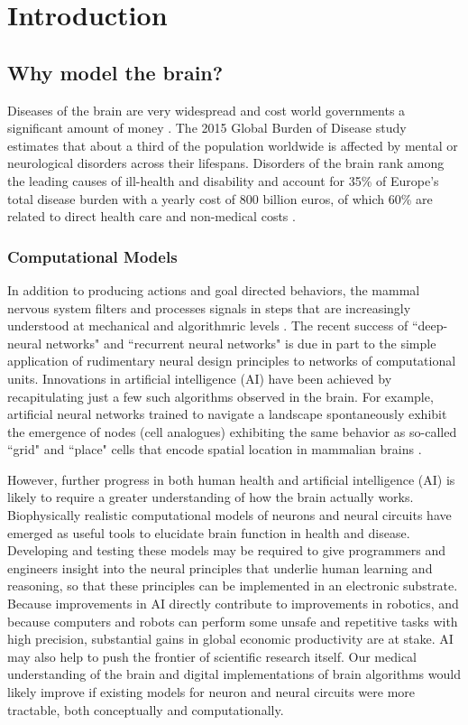 \chapter{Introduction}
\section{Why model the brain?}
Diseases of the brain are very widespread and cost world governments a significant amount of money \citep{who}.
The 2015 Global Burden of Disease study estimates that about a third of the population worldwide is affected by mental or neurological disorders across their lifespans.
Disorders of the brain rank among the leading causes of ill-health and disability and account for 35\% of Europe’s total disease burden with a yearly cost of 800 billion euros, of which 60\% are related to direct health care and non-medical costs \citep{who}. 
\subsection{Computational Models}
In addition to producing actions and goal directed behaviors, the mammal nervous system filters and processes signals in steps that are increasingly understood at mechanical and algorithmric levels \citep{marr1976understanding}.
The recent success of ``deep-neural networks" and ``recurrent neural networks" is due in part to the simple application of rudimentary neural design principles to networks of computational units.
Innovations in artificial intelligence (AI) have been achieved by recapitulating just a few such algorithms observed in the brain.
For example, artificial neural networks trained to navigate a landscape spontaneously exhibit the emergence of nodes (cell analogues) exhibiting the same behavior as so-called ``grid" and ``place" cells that encode spatial location in mammalian brains \citep{banino2018vector}.

However, further progress in both human health and artificial intelligence (AI) is likely to require a greater understanding of how the brain actually works.
Biophysically realistic computational models of neurons and neural circuits have emerged as useful tools to elucidate brain function in health and disease.
Developing and testing these models may be required to give programmers and engineers insight into the neural principles that underlie human learning and reasoning, so that these principles can be implemented in an electronic substrate.
Because improvements in AI directly contribute to improvements in robotics, and because computers and robots can perform some unsafe and repetitive tasks with high precision, substantial gains in global economic productivity are at stake.
AI may also help to push the frontier of scientific research itself.
Our medical understanding of the brain and digital implementations of brain algorithms would likely improve if existing models for neuron and neural circuits were more tractable, both conceptually and computationally.


